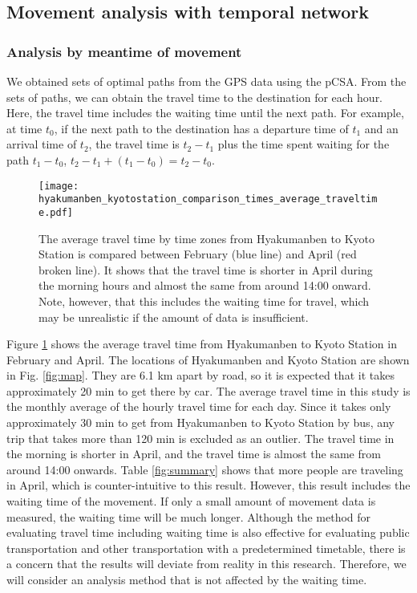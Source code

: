 \documentclass[conference]{IEEEtran}
\begin{document}
\subsection{Movement analysis with temporal network}

\subsubsection{Analysis by meantime of movement}
\par We obtained sets of optimal paths from the GPS data using the pCSA.
From the sets of paths, we can obtain the travel time to the destination for each hour.
Here, the travel time includes the waiting time until the next path.
For example, at time $t_0$, if the next path to the destination has a departure time of $t_1$ and an arrival time of $t_2$, the travel time is $t_2 - t_1$ plus the time spent waiting for the path $t_1- t_0$, $t_2 - t_1 + (t_1- t_0) = t_2 - t_0$.

\begin{figure}[h]
\begin{center}
\texttt{[image: hyakumanben\_kyotostation\_comparison\_times\_average\_traveltime.pdf]}
\caption{The average travel time by time zones from Hyakumanben to Kyoto Station is compared between February (blue line) and April (red broken line).
It shows that the travel time is shorter in April during the morning hours and almost the same from around 14:00 onward.
Note, however, that this includes the waiting time for travel, which may be unrealistic if the amount of data is insufficient.}
		\label{fig:com}
	\end{center}
\end{figure}

\par Figure \ref{fig:com} shows the average travel time from Hyakumanben to Kyoto Station in February and April.
The locations of Hyakumanben and Kyoto Station are shown in Fig. \ref{fig:map}. They are 6.1 km apart by road, so it is expected that it takes approximately 20 min to get there by car.
The average travel time in this study is the monthly average of the hourly travel time for each day.
Since it takes only approximately 30 min to get from Hyakumanben to Kyoto Station by bus, any trip that takes more than 120 min is excluded as an outlier.
The travel time in the morning is shorter in April, and the travel time is almost the same from around 14:00 onwards.
Table \ref{fig:summary} shows that more people are traveling in April, which is counter-intuitive to this result.
However, this result includes the waiting time of the movement.
If only a small amount of movement data is measured, the waiting time will be much longer.
Although the method for evaluating travel time including waiting time is also effective for evaluating public transportation and other transportation with a predetermined timetable, there is a concern that the results will deviate from reality in this research.
Therefore, we will consider an analysis method that is not affected by the waiting time.
\end{document}
